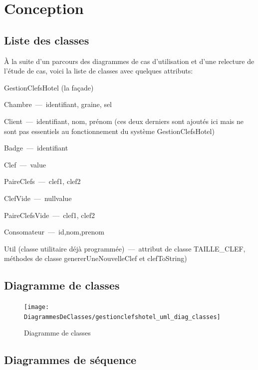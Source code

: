 \documentclass[11pt,article]{article}
\begin{document}
\section{Conception}

\subsection{Liste des classes}

À la suite d'un parcours des diagrammes de cas d'utilisation et d'une
relecture de l'étude de cas, voici la liste de classes avec quelques
attributs:
\begin{compactitem}
\item \textsf{GestionClefsHotel} (la façade)
\item \textsf{Chambre}~---~identifiant, graine, sel
\item \textsf{Client}~---~identifiant, nom, prénom (ces deux derniers
  sont ajoutés ici mais ne sont pas essentiels au fonctionnement du
  système \textsf{GestionClefsHotel})
\item \textsf{Badge}~---~identifiant
\item \textsf{Clef}~---~value
\item \textsf{PaireClefs}~---~clef1, clef2
\item \textsf{ClefVide}~---~nullvalue
\item \textsf{PaireClefsVide}~---~clef1, clef2
\item \textsf{Consomateur}~---~id,nom,prenom
\item \textsf{Util} (classe utilitaire déjà programmée)~---~attribut
  de classe \textsf{TAILLE\_CLEF}, méthodes de classe
  \textsf{genererUneNouvelleClef} et \textsf{clefToString})
\end{compactitem}
\newpage

\subsection{Diagramme de classes}

\begin{figure}[h!]
  \texttt{[image: DiagrammesDeClasses/gestionclefshotel\_uml\_diag\_classes]}
  \caption{Diagramme de classes}
  \label{umlet_diag_classes}
\end{figure}

\newpage

\subsection{Diagrammes de séquence}
\end{document}
